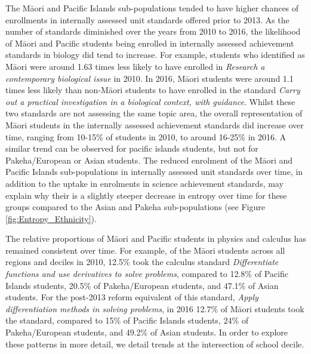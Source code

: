The M\={a}ori and Pacific Islands sub-populations tended to have higher chances of enrollments in internally assessed unit standards offered prior to 2013. As the number of standards diminished over the years from 2010 to 2016, the likelihood of M\={a}ori and Pacific students being enrolled in internally assessed achievement standards in biology did tend to increase. For example, students who identified as M\={a}ori were around 1.63 times less likely to have enrolled in \textit{Research a contemporary biological issue} in 2010. In 2016, M\={a}ori students were around 1.1 times less likely than non-M\={a}ori students to have enrolled in the standard \textit{Carry out a practical investigation in a biological context, with guidance}. Whilst these two standards are not assessing the same topic area, the overall representation of M\={a}ori students in the internally assessed achievement standards did increase over time, ranging from 10-15\% of students in 2010, to around 16-25\% in 2016. A similar trend can be observed for pacific islands students, but not for Pakeha/European or Asian students. The reduced enrolment of the M\={a}ori and Pacific Islands sub-populations in internally assessed unit standards over time, in addition to the uptake in enrolments in science achievement standards, may explain why their is a slightly steeper decrease in entropy over time for these groups compared to the Asian and Pakeha sub-populations (see Figure \ref{fig:Entropy_Ethnicity}). 

The relative proportions of M\={a}ori and Pacific students in physics and calculus has remained consistent over time. For example, of the M\={a}ori students across all regions and deciles in 2010, 12.5\% took the calculus standard \textit{Differentiate functions and use derivatives to solve problems}, compared to 12.8\% of Pacific Islands students, 20.5\% of Pakeha/European students, and 47.1\% of Asian students. For the post-2013 reform equivalent of this standard, \textit{Apply differentiation methods in solving problems}, in 2016 12.7\% of M\={a}ori students took the standard, compared to 15\% of Pacific Islands students, 24\% of Pakeha/European students, and 49.2\% of Asian students. In order to explore these patterns in more detail, we detail trends at the intersection of school decile. 

